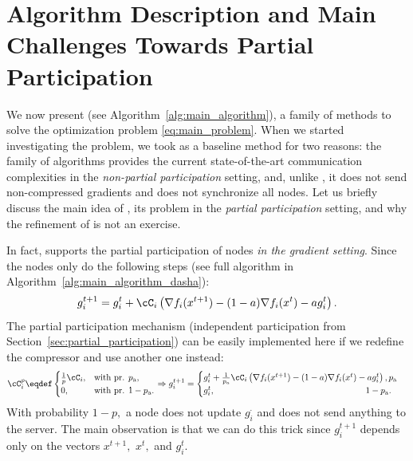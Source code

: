 \documentclass{article}
\newcommand{\algorithmname}{DASHA-PP}
\newcommand*{\probavailable}{\ensuremath{p_{\textnormal{a}}}}
\begin{document}
\section{Algorithm Description and Main Challenges Towards Partial Participation}

We now present \algname{\algorithmname} (see Algorithm~\ref{alg:main_algorithm}), a family of methods to solve the optimization problem \eqref{eq:main_problem}. When we started investigating the problem, we took  as a baseline method for two reasons: the family of algorithms  provides the current state-of-the-art communication complexities in the \emph{non-partial participation} setting, and, unlike , it does not send non-compressed gradients and does not synchronize all nodes. Let us briefly discuss the main idea of , its problem in the \emph{partial participation} setting, and why the refinement of  is not an exercise.

In fact,  supports the partial participation of nodes \emph{in the gradient setting}. Since the nodes only do the following steps (see full algorithm in Algorithm~\ref{alg:main_algorithm_dasha}):
\begin{align*}
  g^{t+1}_i = g^{t}_i + \cC_i\left(\nabla f_i(x^{t+1}) - (1 - a)\nabla f_i(x^{t}) - a g^{t}_i\right).
\end{align*}
The partial participation mechanism (independent participation from Section~\ref{sec:partial_participation}) can be easily implemented here if we redefine the compressor and use another one instead:
\begin{align*}
  \cC_{i}^p \eqdef \begin{cases}
    \frac{1}{p}\cC_{i},& \textnormal{with pr. } \probavailable,\\
    0,& \textnormal{with pr. } 1 - \probavailable.
  \end{cases} \Rightarrow g^{t+1}_i = \begin{cases}
    g^{t}_i + \frac{1}{\probavailable}\cC_i\left(\nabla f_i(x^{t+1}) - (1 - a)\nabla f_i(x^{t}) - a g^{t}_i\right), \probavailable\\
    g^{t}_i, \hspace{6.1cm}1 - \probavailable.
  \end{cases}
\end{align*}
With probability $1 - p,$ a node does not update $g_i^{\cdot}$ and does not send anything to the server. The main observation is that we can do this trick since $g^{t+1}_i$ depends only on the vectors $x^{t+1},$ $x^{t},$ and $g^{t}_i$.
\end{document}
